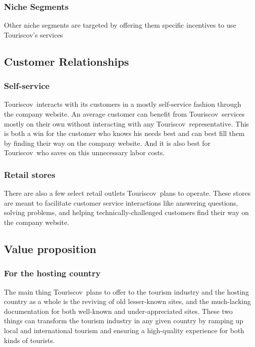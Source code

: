 \documentclass[12pt]{article}
\newcommand{\tco}{Touriscov}
\begin{document}
\subsubsection{Niche Segments}
Other niche segments are targeted by offering them specific incentives to use Touriscov's services

\subsection{Customer Relationships}

\subsubsection{Self-service}
\tco\ interacts with its customers in a mostly self-service fashion through the company website. An average customer can benefit from \tco\ services mostly on their own without interacting with any \tco\ representative. This is both a win for the customer who knows his needs best and can best fill them by finding their way on the company website. And it is also best for \tco\ who saves on this unnecessary labor costs.

\subsubsection{Retail stores}
There are also a few select retail outlets \tco\ plans to operate. These stores are meant to facilitate customer service interactions like answering questions, solving problems, and helping technically-challenged customers find their way on the company website. 


\subsection{Value proposition}
\subsubsection{For the hosting country}
The main thing \tco\ plans to offer to the tourism industry and the hosting country as a whole is the reviving of old lesser-known sites, and the much-lacking documentation for both well-known and under-appreciated sites. These two things can transform the tourism industry in any given country by ramping up local and international tourism and ensuring a high-quality experience for both kinds of tourists.\ \par
\end{document}
